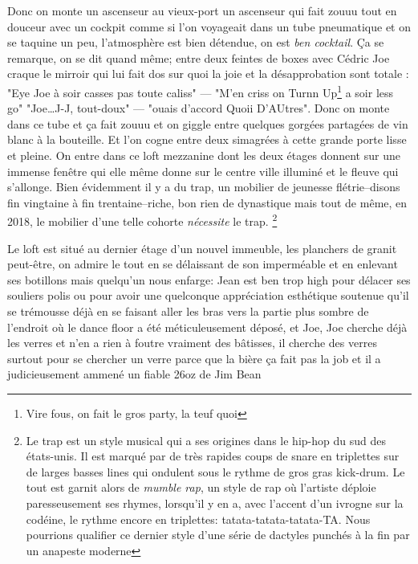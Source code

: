 Donc on monte un ascenseur au vieux-port un ascenseur qui fait zouuu tout en
douceur avec un cockpit comme si l'on voyageait dans un tube pneumatique et
on se taquine un peu, l'atmosphère est bien détendue, on est \emph{ben cocktail}.
Ça se remarque, on se dit quand même; entre deux feintes de boxes avec
Cédric Joe craque le mirroir qui lui fait dos sur quoi la joie et la
désapprobation sont totale : "Eye Joe à soir casses pas toute caliss" --- "M'en
criss on Turnn Up\footnote{Vire fous, on fait le gros party, la teuf quoi} a
soir less go" "Joe\ldots J-J, tout-doux" --- "ouais d'accord Quoii
D'AUtres".  Donc on monte dans ce tube et ça fait zouuu et on giggle entre
quelques gorgées partagées de vin blanc à la bouteille. Et l'on cogne entre
deux simagrées à cette grande porte lisse et pleine. On entre dans ce loft
mezzanine dont les deux étages donnent sur une immense fenêtre qui elle même
donne sur le centre ville illuminé et le fleuve qui s'allonge.  Bien évidemment
il y a du
trap, un mobilier de jeunesse flétrie--disons fin vingtaine à fin
trentaine--riche, bon rien de dynastique mais tout de même, en 2018, le
mobilier d'une telle cohorte \emph{nécessite} le trap.  \footnote{Le trap est un style musical qui a ses origines dans le
        hip-hop du sud des états-unis. Il est marqué par de très rapides coups
        de snare en triplettes sur de larges basses lines qui ondulent sous le
        rythme de gros gras kick-drum.  Le tout est garnit alors de
        \textit{mumble rap}, un style de rap où l'artiste déploie paresseusement
        ses rhymes, lorsqu'il y en a, avec l'accent d'un ivrogne sur la codéine,
        le rythme encore en triplettes: tatata-tatata-tatata-TA.  Nous pourrions
        qualifier ce dernier style d'une série de dactyles punchés à la fin par
un anapeste moderne} 

Le loft est situé au dernier étage d'un nouvel immeuble, les planchers de granit peut-être, on admire
le tout en se délaissant de son imperméable et en enlevant ses botillons
mais quelqu'un nous enfarge: Jean est ben trop high pour délacer ses souliers
polis ou pour avoir une quelconque appréciation esthétique soutenue 
qu'il se trémousse déjà en se faisant aller les bras vers la partie
plus sombre de l'endroit où le dance floor a été méticuleusement déposé, et
Joe, Joe cherche déjà les verres et n'en a rien à foutre vraiment des bâtisses,
il cherche des
verres surtout pour se chercher un verre parce que la bière ça fait pas la job
et il a judicieusement ammené un fiable 26oz de Jim Bean 
\begin{comment}Le Jim
    Bean est un whiskey, un bourbon pour être plus précis, connu comme étant
    typiffiant de l'amérique avec un gros r sale, d'une toxicité masculine, avec
    sa bouteille nettement carrée et son petit coup de coude en fin de gorgée,
il est pas mal quand même.  Et pour le prix, pour le prix\ldots 
\end{comment}

